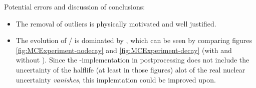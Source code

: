 Potential errors and discussion of conclusions:
\begin{itemize}
\item The removal of outliers is physically motivated and well justified.
\item The evolution of / is dominated by \betadecay, which can be seen by comparing figures \ref{fig:MCExperiment-nodecay} and \ref{fig:MCExperiment-decay} (with and without \betadecay). Since the \betadecay-implementation in postprocessing does not include the uncertainty of the  halflife (at least in those figures) alot of the real nuclear uncertainty \textit{vanishes}, this implemtation could be improved upon.
\end{itemize}

